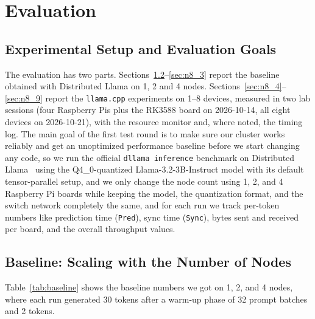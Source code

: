 \documentclass[11pt,a4paper]{article}
\begin{document}
\section{Evaluation}\label{sec:n8}

\subsection{Experimental Setup and Evaluation Goals}\label{sec:n8_1}
The evaluation has two parts. Sections~\ref{sec:n8_2}--\ref{sec:n8_3} report the baseline obtained with Distributed Llama on 1, 2 and 4 nodes. Sections~\ref{sec:n8_4}--\ref{sec:n8_9} report the \texttt{llama.cpp} experiments on 1--8 devices, measured in two lab sessions (four Raspberry Pis plus the RK3588 board on 2026-10-14, all eight devices on 2026-10-21), with the resource monitor and, where noted, the timing log. The main goal of the first test round is to make sure our cluster works reliably and get an unoptimized performance baseline before we start changing any code, so we run the official \texttt{dllama inference} benchmark on Distributed Llama~\cite{distributedllama} using the Q4\_0-quantized Llama-3.2-3B-Instruct model with its default tensor-parallel setup, and we only change the node count using 1, 2, and 4 Raspberry Pi boards while keeping the model, the quantization format, and the switch network completely the same, and for each run we track per-token numbers like prediction time (\texttt{Pred}), sync time (\texttt{Sync}), bytes sent and received per board, and the overall throughput values.

\subsection{Baseline: Scaling with the Number of Nodes}\label{sec:n8_2}
Table~\ref{tab:baseline} shows the baseline numbers we got on 1, 2, and 4 nodes, where each run generated 30 tokens after a warm-up phase of 32 prompt batches and 2 tokens.

\begin{table}[H]
\centering
\caption{Baseline results for Llama-3.2-3B-Instruct (Q4\_0) on 1, 2 and 4 Raspberry Pi nodes connected through a switch, using the unmodified Distributed Llama framework.}
\label{tab:baseline}
\end{table}
\end{document}
